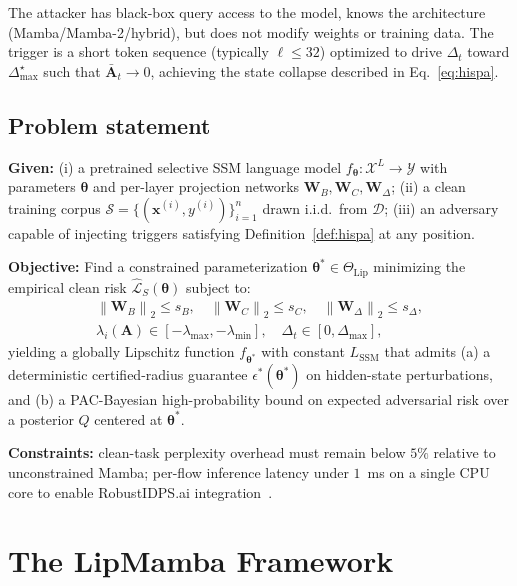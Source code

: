 \documentclass[journal,a4paper,10pt]{IEEEtran}
\theoremstyle{definition}
\theoremstyle{remark}
\newcommand{\modelname}{LipMamba}
\newcommand{\Lcal}{\mathcal{L}}
\newcommand{\Dcal}{\mathcal{D}}
\newcommand{\Xcal}{\mathcal{X}}
\newcommand{\Ycal}{\mathcal{Y}}
\newcommand{\Scal}{\mathcal{S}}
\newcommand{\norm}[1]{\left\|#1\right\|}
\begin{document}
The attacker has black-box query access to the model, knows the architecture (Mamba/Mamba-2/hybrid), but does not modify weights or training data. The trigger is a short token sequence (typically $\ell \leq 32$) optimized to drive $\Delta_t$ toward $\Delta_{\max}^\star$ such that $\bar{\mathbf{A}}_t \to 0$, achieving the state collapse described in Eq.~\eqref{eq:hispa}.

\subsection{Problem statement}

\noindent\textbf{Given:} (i) a pretrained selective SSM language model $f_{\bm{\theta}}: \Xcal^L \to \Ycal$ with parameters $\bm{\theta}$ and per-layer projection networks $\mathbf{W}_B, \mathbf{W}_C, \mathbf{W}_\Delta$; (ii) a clean training corpus $\Scal = \{(\mathbf{x}^{(i)}, y^{(i)})\}_{i=1}^n$ drawn i.i.d.\ from $\Dcal$; (iii) an adversary capable of injecting triggers satisfying Definition~\ref{def:hispa} at any position.

\noindent\textbf{Objective:} Find a constrained parameterization $\bm{\theta}^* \in \Theta_{\mathrm{Lip}}$ minimizing the empirical clean risk $\hat{\Lcal}_S(\bm{\theta})$ subject to:
\begin{align}
    \norm{\mathbf{W}_B}_2 \leq s_B,\quad
    \norm{\mathbf{W}_C}_2 \leq s_C,\quad
    \norm{\mathbf{W}_\Delta}_2 \leq s_\Delta, \label{eq:spec}\\
    \lambda_i(\mathbf{A}) \in [-\lambda_{\max}, -\lambda_{\min}],\quad
    \Delta_t \in [0, \Delta_{\max}], \label{eq:eig}
\end{align}
yielding a globally Lipschitz function $f_{\bm{\theta}^*}$ with constant $L_{\mathrm{SSM}}$ that admits (a) a deterministic certified-radius guarantee $\epsilon^*(\bm{\theta}^*)$ on hidden-state perturbations, and (b) a PAC-Bayesian high-probability bound on expected adversarial risk over a posterior $Q$ centered at $\bm{\theta}^*$.

\noindent\textbf{Constraints:} clean-task perplexity overhead must remain below $5\%$ relative to unconstrained Mamba; per-flow inference latency under $1$~ms on a single CPU core to enable RobustIDPS.ai integration~\cite{anaedevha2026robustidps}.


\section{The \modelname{} Framework}
\label{sec:framework}
\end{document}
